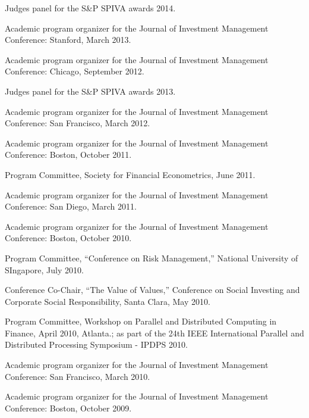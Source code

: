 \documentclass{article}
\begin{document}
\begin{description}
\begin{etaremune}
\item Judges panel for the S\&P SPIVA awards 2014. 

\item Academic program organizer for the Journal of Investment Management
Conference: Stanford, March 2013. 

\item Academic program organizer for the Journal of Investment Management
Conference: Chicago, September 2012. 

\item Judges panel for the S\&P SPIVA awards 2013. 

\item Academic program organizer for the Journal of Investment Management
Conference: San Francisco, March 2012. 

\item Academic program organizer for the Journal of Investment Management
Conference: Boston, October 2011. 

\item Program Committee, Society for Financial Econometrics, June 2011. 

\item Academic program organizer for the Journal of Investment Management
Conference: San Diego, March 2011. 

\item Academic program organizer for the Journal of Investment Management
Conference: Boston, October 2010. 

\item Program Committee, ``Conference on Risk Management,'' National University of SIngapore, July 2010. 

\item Conference Co-Chair, ``The Value of Values,'' Conference on Social Investing and Corporate Social Responsibility, Santa Clara, May 2010. 

\item Program Committee, Workshop on Parallel and Distributed Computing in Finance, April 2010, Atlanta.; as part of the 24th IEEE International Parallel and Distributed Processing Symposium - IPDPS 2010.

\item Academic program organizer for the Journal of Investment Management
Conference: San Francisco, March 2010.

\item Academic program organizer for the Journal of Investment Management
Conference: Boston, October 2009. 


\end{etaremune}
\end{description}
\end{document}
